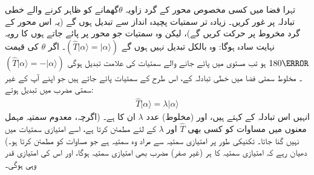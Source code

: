 تہرا فضا میں کسی مخصوص محور کے گرد زاویہ \(\theta\)گھمانے کو ظاہر کرنے والے خطی تبادلہ پر غور کریں۔ زیادہ تر سمتیات پچیدہ انداز سے تبدیل ہوں گے (یہ اس محور کے گرد مخروط پر حرکت کریں گے)،   لیکن وہ سمتیات جو  محور پر پائے جاتے ہوں کا رویہ نہایت سادہ ہوگا:  وہ بالکل تبدیل نہیں ہوں گے \((\hat{T}| \alpha \rangle=| \alpha \rangle)\)۔ اگر \(\theta\) کی قیمت \(\num{180}\degree\) ہو تب  مستوی میں پائے جانے والے سمتیات کی علامت تبدیل ہوگی \((\hat{T}| \alpha \rangle = -| \alpha \rangle)\)۔ مخلوط سمتی فضا  میں  خطی تبادلہ کے،  اس طرح کے   سمتیات پائے جاتے ہیں جو اپنے آپ کے غیر سمتی مضرب میں تبدیل ہوتے:
\begin{align}\label{مساوات_ضمیمہ_مخصوص_سمتیات}
		\hat{T}|\alpha\rangle = \lambda|\alpha\rangle
\end{align}
انہیں اس تبادلہ کے    کہتے ہیں،  اور  (مخلوط)  عدد \(\lambda\) ان کا   ہے۔ (اگرچہ، معدوم سمتیہ مہمل  معنوں میں مساوات   کو کسی بھی \(\hat{T}\) اور \(\lambda\) کے لئے مطمئن کرتا ہے،  اسے امتیازی سمتیات میں نہیں گنا جاتا۔ تکنیکی طور پر  امتیازی سمتیہ سے مراد وہ   سمتیہ ہے جو مساوات  کو  مطمئن کرتا ہو۔)  دھیان رہے کہ امتیازی سمتیہ کا ہر   (غیر صفر)  مضرب بھی امتیازی سمتیہ ہوگا،  اور اس  کی امتیازی قدر وہی ہوگی۔

